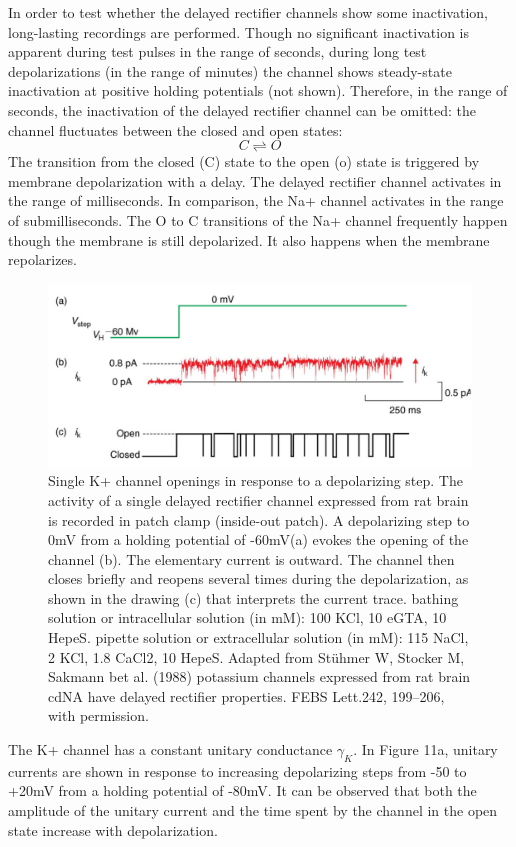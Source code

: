 \documentclass[../../Orator]{subfiles}
\begin{document}
In order to test whether the delayed rectifier channels show some inactivation, long-lasting recordings are performed. Though no significant inactivation is apparent during test pulses in the range of seconds, during long test depolarizations (in the range of minutes) the channel shows steady-state inactivation at positive holding potentials (not shown). Therefore, in the range of seconds, the inactivation of the delayed rectifier channel can be omitted: the channel fluctuates between the closed and open states:
\[C\rightleftharpoons O\]
The transition from the closed (C) state to the open (o) state is triggered by membrane depolarization with a delay. The delayed rectifier channel activates in the range of milliseconds. In comparison, the Na+ channel activates in the range of submilliseconds. The O to C transitions of the Na+ channel frequently happen though the membrane is still depolarized. It also happens when the membrane repolarizes. 
  \begin{figure}[H]
      \centering
      \includegraphics[width=0.5\linewidth]{Pictures//Anakin/K+channel.png}
      \caption{Single K+ channel openings in response to a depolarizing step. The activity of a single delayed rectifier channel expressed from rat brain is recorded in patch clamp (inside-out patch). A depolarizing step to 0mV from a holding potential of -60mV(a) evokes the opening of the channel (b). The elementary current is outward. The channel then closes briefly and reopens several times during the depolarization, as shown in the drawing (c) that interprets the current trace. bathing solution or intracellular solution (in mM): 100 KCl, 10 eGTA, 10 HepeS. pipette solution or extracellular solution (in mM): 115 NaCl, 2 KCl, 1.8 CaCl2, 10 HepeS. Adapted from Stühmer W, Stocker M, Sakmann bet al. (1988) potassium channels expressed from rat brain cdNA have delayed rectifier properties. FEBS Lett.242, 199–206, with permission. }
      \label{fig:enter-label}
  \end{figure}

The K+ channel has a constant unitary conductance \(\gamma_K\). In Figure 11a, unitary currents are shown in response to increasing depolarizing steps from -50 to +20mV from a holding potential of -80mV. It can be observed that both the amplitude of the unitary current and the time spent by the channel in the open state increase with depolarization. 
\end{document}
